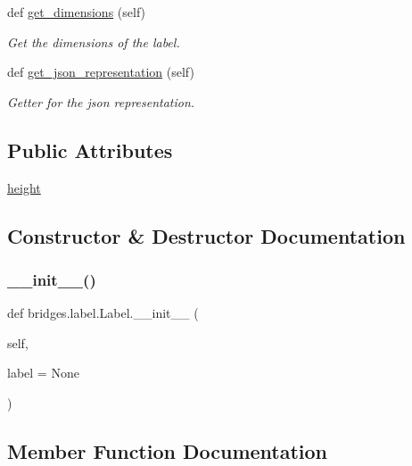 \begin{DoxyCompactItemize}
def \mbox{\hyperlink{classbridges_1_1label_1_1_label_a627bc596c7e3db837e3b1575282e1b98}{get\+\_\+dimensions}} (self)
\begin{DoxyCompactList}\small\item\em Get the dimensions of the label. \end{DoxyCompactList}\item 
def \mbox{\hyperlink{classbridges_1_1label_1_1_label_a5075b73938ca71eed43af12f26a71842}{get\+\_\+json\+\_\+representation}} (self)
\begin{DoxyCompactList}\small\item\em Getter for the json representation. \end{DoxyCompactList}\end{DoxyCompactItemize}
\subsection*{Public Attributes}
\begin{DoxyCompactItemize}
\item 
\mbox{\hyperlink{classbridges_1_1label_1_1_label_a2bf622aa77b4ad7d6918db99a8bfd4da}{height}}
\end{DoxyCompactItemize}


\subsection{Constructor \& Destructor Documentation}
\mbox{\label{classbridges_1_1label_1_1_label_a9a6a9ba4ccb2757f0577d741d730c95c}} 
\subsubsection{\texorpdfstring{\+\_\+\+\_\+init\+\_\+\+\_\+()}{\_\_init\_\_()}}
{\footnotesize\ttfamily def bridges.\+label.\+Label.\+\_\+\+\_\+init\+\_\+\+\_\+ (\begin{DoxyParamCaption}\item[{}]{self,  }\item[{}]{label = {\ttfamily None} }\end{DoxyParamCaption})}



\subsection{Member Function Documentation}
\mbox{\label{classbridges_1_1label_1_1_label_ae1f120fa56b03e9937357a830bff7cf6}} 

